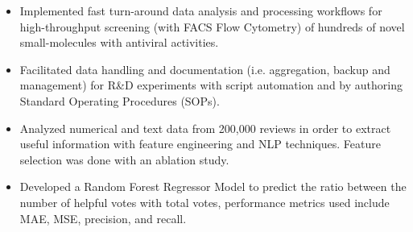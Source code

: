 \documentclass[10pt,a4paper]{altacv}
\begin{document}
\begin{itemize}
    \item   \small{Implemented fast turn-around data analysis and processing workflows for high-throughput screening (with FACS Flow Cytometry) of hundreds of novel small-molecules with antiviral activities.}
    \item   \small{Facilitated data handling and documentation (i.e. aggregation, backup and management) for R\&D experiments with script automation and by authoring Standard Operating Procedures (SOPs).}
    
\end{itemize}

\medskip







\begin{itemize}
  \item \small Analyzed numerical and text data from 200,000 reviews in order to extract useful information with feature engineering and NLP techniques. Feature selection was done with an ablation study. 
    \item \small Developed a Random Forest Regressor Model to predict the ratio between the number of helpful votes with total votes, performance metrics used include MAE, MSE, precision, and recall. 
\end{itemize}

\medskip


\end{document}
